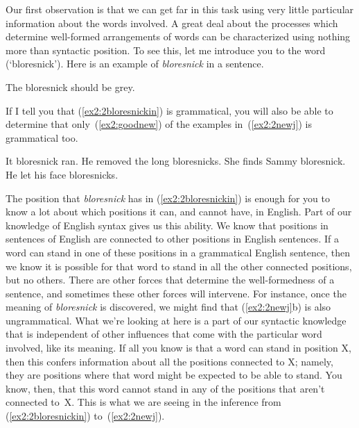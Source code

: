 Our first observation is that we can get far in this task using very little particular information about the words involved. A great deal about the processes which determine well-formed arrangements of words can be characterized using nothing more than syntactic position. To see this, let me introduce you to the word  (`bloresnick'). Here is an example of \emph{bloresnick} in a sentence.
\begin{exe}
	\ex \label{ex2:2bloresnickin} The bloresnick should be grey.
\end{exe}
If I tell you that (\ref{ex2:2bloresnickin}) is grammatical, you will also be able to determine that only~(\ref{ex2:goodnew}) of the examples in~(\ref{ex2:2newj}) is grammatical too.
\begin{exe}
\ex \label{ex2:2newj} 
\begin{xlist}
	\ex It bloresnick ran.
	\ex \label{ex2:goodnew} He removed the long bloresnicks.
	\ex She finds Sammy bloresnick.
	\ex He let his face bloresnicks.
\end{xlist}
\end{exe}
The position that \emph{bloresnick} has in (\ref{ex2:2bloresnickin}) is enough for you to know a lot about which positions it can, and cannot have, in English. Part of our knowledge of English syntax gives us this ability. We know that positions in sentences of English are connected to other positions in English sentences. If a word can stand in one of these positions in a grammatical English sentence, then we know it is possible for that word to stand in all the other connected positions, but no others. There are other forces that determine the well-formedness of a sentence, and sometimes these other forces will intervene. For instance, once the meaning of \emph{bloresnick} is discovered, we might find that (\ref{ex2:2newj}b) is also ungrammatical. What we're looking at here is a part of our syntactic knowledge that is independent of other influences that come with the particular word involved, like its meaning. If all you know is that a word can stand in position X, then this confers information about all the positions connected to X; namely, they are positions where that word might be expected to be able to stand. You know, then, that this word cannot stand in any of the positions that aren't connected to~X. This is what we are seeing in the inference from (\ref{ex2:2bloresnickin}) to~(\ref{ex2:2newj}).

